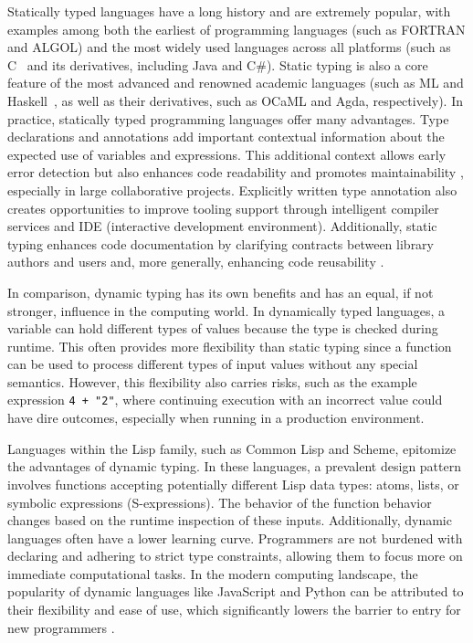 Statically typed languages have a long history and are extremely popular, with examples among both the earliest of programming languages (such as FORTRAN \cite{Backus1978-xt} and ALGOL) and the most widely used languages across all platforms (such as C~\cite{Ritchie1978-pa} and its derivatives, including Java and C\#). Static typing is also a core feature of the most advanced and renowned academic languages (such as ML and Haskell~\cite{Hudak2007-kn}, as well as their derivatives, such as OCaML and Agda, respectively). In practice, statically typed programming languages offer many advantages. Type declarations and annotations add important contextual information about the expected use of variables and expressions. This additional context allows early error detection but also enhances code readability and promotes maintainability \cite{Kleinschmager2012-bg}, especially in large collaborative projects. Explicitly written type annotation also creates opportunities to improve tooling support through intelligent compiler services and IDE (interactive development environment). Additionally, static typing enhances code documentation by clarifying contracts between library authors and users and, more generally, enhancing code reusability \cite{Endrikat2014-uz}.


In comparison, dynamic typing has its own benefits and has an equal, if not stronger, influence in the computing world. In dynamically typed languages, a variable can hold different types of values because the type is checked during runtime. This often provides more flexibility than static typing since a function can be used to process different types of input values without any special semantics. However, this flexibility also carries risks, such as the example expression \texttt{4 + "2"}, where continuing execution with an incorrect value could have dire outcomes, especially when running in a production environment.

Languages within the Lisp family, such as Common Lisp and Scheme, epitomize the advantages of dynamic typing. In these languages, a prevalent design pattern involves functions accepting potentially different Lisp data types: atoms, lists, or symbolic expressions (S-expressions). The behavior of the function behavior changes based on the runtime inspection of these inputs. Additionally, dynamic languages often have a lower learning curve. Programmers are not burdened with declaring and adhering to strict type constraints, allowing them to focus more on immediate computational tasks. In the modern computing landscape, the popularity of dynamic languages like JavaScript and Python can be attributed to their flexibility and ease of use, which significantly lowers the barrier to entry for new programmers \cite{Chatley2019-uq}.


